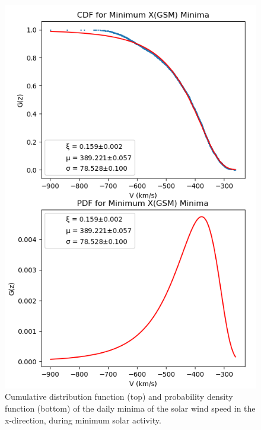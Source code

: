 \documentclass[11pt]{article}
\begin{document}
\begin{figure}[t!]
\begin{minipage}{0.48\textwidth}
                \includegraphics[width=\textwidth]{fig_method/SWEminXmin.png}
                \caption{Cumulative distribution function (top) and probability density function (bottom) of the daily minima of the solar wind speed in the x-direction, during minimum solar activity.}
                \label{fig:SWEminXmin}
            \end{minipage}
        \end{figure}
\end{document}
